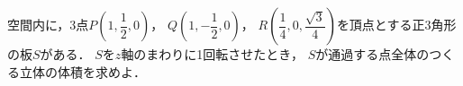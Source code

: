 \documentclass[../../main.tex]{subfiles}
\begin{document}
空間内に，3点$\displaystyle P \left( 1,\dfrac{1}{2},0 \right)$，
$\displaystyle Q \left( 1,-\dfrac{1}{2},0 \right)$，
$\displaystyle R \left( \dfrac{1}{4},0,\dfrac{\sqrt3}{4} \right)$を頂点とする正3角形の板$S$がある．
$S$を$z$軸のまわりに1回転させたとき，
$S$が通過する点全体のつくる立体の体積を求めよ．
\end{document}

